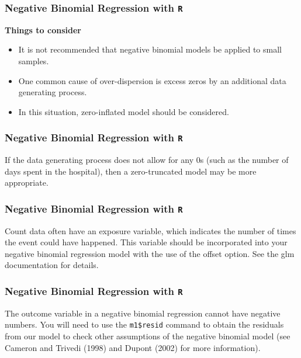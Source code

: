 \documentclass[00-GLMregslides.tex]{subfiles}
\begin{document}
\begin{frame}[fragile]
	\frametitle{Negative Binomial Regression with \texttt{R} }
	\Large
	
	\textbf{Things to consider}
	\begin{itemize}
	\item It is not recommended that negative binomial models be applied to small samples.
	\item One common cause of over-dispersion is excess zeros by an additional data generating process. 
	\item In this situation, zero-inflated model should be considered.
	\end{itemize}
\end{frame}
\begin{frame}[fragile]
	\frametitle{Negative Binomial Regression with \texttt{R} }
	\Large
	
	If the data generating process does not allow for any 0s (such as the number of days spent in the hospital), then a zero-truncated model may be more appropriate.
\end{frame}
\begin{frame}[fragile]
	\frametitle{Negative Binomial Regression with \texttt{R} }
	\Large
	Count data often have an exposure variable, which indicates the number of times the event could have happened. This variable should be incorporated into your negative binomial regression model with the use of the offset option. See the glm documentation for details.
\end{frame}
\begin{frame}[fragile]
	\frametitle{Negative Binomial Regression with \texttt{R} }
	\Large
	The outcome variable in a negative binomial regression cannot have negative numbers.
	You will need to use the \texttt{m1\$resid} command to obtain the residuals from our model to check other assumptions of the negative binomial model (see Cameron and Trivedi (1998) and Dupont (2002) for more information).
\end{frame}


\end{document}
